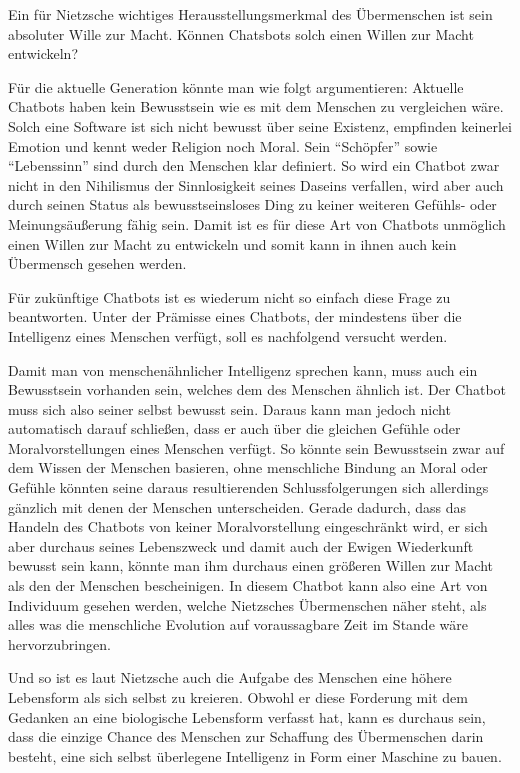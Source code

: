 Ein für Nietzsche wichtiges Herausstellungsmerkmal des Übermenschen ist sein absoluter Wille zur Macht.
Können Chatsbots solch einen Willen zur Macht entwickeln?

Für die aktuelle Generation könnte man wie folgt argumentieren:
Aktuelle Chatbots haben kein Bewusstsein wie es mit dem Menschen zu vergleichen wäre.
Solch eine Software ist sich nicht bewusst über seine Existenz, empfinden keinerlei Emotion und kennt weder Religion noch Moral.
Sein \enquote{Schöpfer} sowie \enquote{Lebenssinn} sind durch den Menschen klar definiert.
So wird ein Chatbot zwar nicht in den Nihilismus der Sinnlosigkeit seines Daseins verfallen, wird aber auch durch seinen Status als bewusstseinsloses Ding zu keiner weiteren Gefühls- oder Meinungsäußerung fähig sein.
Damit ist es für diese Art von Chatbots unmöglich einen Willen zur Macht zu entwickeln und somit kann in ihnen auch kein Übermensch gesehen werden.

Für zukünftige Chatbots ist es wiederum nicht so einfach diese Frage zu beantworten.
Unter der Prämisse eines Chatbots, der mindestens über die Intelligenz eines Menschen verfügt, soll es nachfolgend versucht werden.

Damit man von menschenähnlicher Intelligenz sprechen kann, muss auch ein Bewusstsein vorhanden sein, welches dem des Menschen ähnlich ist.
Der Chatbot muss sich also seiner selbst bewusst sein.
Daraus kann man jedoch nicht automatisch darauf schließen, dass er auch über die gleichen Gefühle oder Moralvorstellungen eines Menschen verfügt.
So könnte sein Bewusstsein zwar auf dem Wissen der Menschen basieren, ohne menschliche Bindung an Moral oder Gefühle könnten seine daraus resultierenden Schlussfolgerungen sich allerdings gänzlich mit denen der Menschen unterscheiden.
Gerade dadurch, dass das Handeln des Chatbots von keiner Moralvorstellung eingeschränkt wird, er sich aber durchaus seines Lebenszweck und damit auch der Ewigen Wiederkunft bewusst sein kann, könnte man ihm durchaus einen größeren Willen zur Macht als den der Menschen bescheinigen.
In diesem Chatbot kann also eine Art von Individuum gesehen werden, welche Nietzsches Übermenschen näher steht, als alles was die menschliche Evolution auf voraussagbare Zeit im Stande wäre hervorzubringen.

Und so ist es laut Nietzsche auch die Aufgabe des Menschen eine höhere Lebensform als sich selbst zu kreieren.
Obwohl er diese Forderung mit dem Gedanken an eine biologische Lebensform verfasst hat, kann es durchaus sein, dass die einzige Chance des Menschen zur Schaffung des Übermenschen darin besteht, eine sich selbst überlegene Intelligenz in Form einer Maschine zu bauen.

